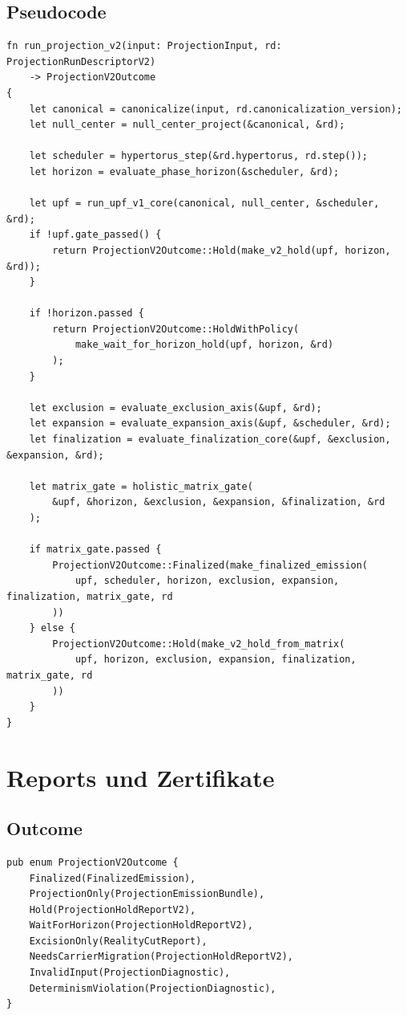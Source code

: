 \documentclass[11pt,a4paper]{article}
\begin{document}
\subsection{Pseudocode}
\begin{lstlisting}
fn run_projection_v2(input: ProjectionInput, rd: ProjectionRunDescriptorV2)
    -> ProjectionV2Outcome
{
    let canonical = canonicalize(input, rd.canonicalization_version);
    let null_center = null_center_project(&canonical, &rd);

    let scheduler = hypertorus_step(&rd.hypertorus, rd.step());
    let horizon = evaluate_phase_horizon(&scheduler, &rd);

    let upf = run_upf_v1_core(canonical, null_center, &scheduler, &rd);
    if !upf.gate_passed() {
        return ProjectionV2Outcome::Hold(make_v2_hold(upf, horizon, &rd));
    }

    if !horizon.passed {
        return ProjectionV2Outcome::HoldWithPolicy(
            make_wait_for_horizon_hold(upf, horizon, &rd)
        );
    }

    let exclusion = evaluate_exclusion_axis(&upf, &rd);
    let expansion = evaluate_expansion_axis(&upf, &scheduler, &rd);
    let finalization = evaluate_finalization_core(&upf, &exclusion, &expansion, &rd);

    let matrix_gate = holistic_matrix_gate(
        &upf, &horizon, &exclusion, &expansion, &finalization, &rd
    );

    if matrix_gate.passed {
        ProjectionV2Outcome::Finalized(make_finalized_emission(
            upf, scheduler, horizon, exclusion, expansion, finalization, matrix_gate, rd
        ))
    } else {
        ProjectionV2Outcome::Hold(make_v2_hold_from_matrix(
            upf, horizon, exclusion, expansion, finalization, matrix_gate, rd
        ))
    }
}
\end{lstlisting}

\section{Reports und Zertifikate}

\subsection{Outcome}
\begin{lstlisting}
pub enum ProjectionV2Outcome {
    Finalized(FinalizedEmission),
    ProjectionOnly(ProjectionEmissionBundle),
    Hold(ProjectionHoldReportV2),
    WaitForHorizon(ProjectionHoldReportV2),
    ExcisionOnly(RealityCutReport),
    NeedsCarrierMigration(ProjectionHoldReportV2),
    InvalidInput(ProjectionDiagnostic),
    DeterminismViolation(ProjectionDiagnostic),
}
\end{lstlisting}
\end{document}
